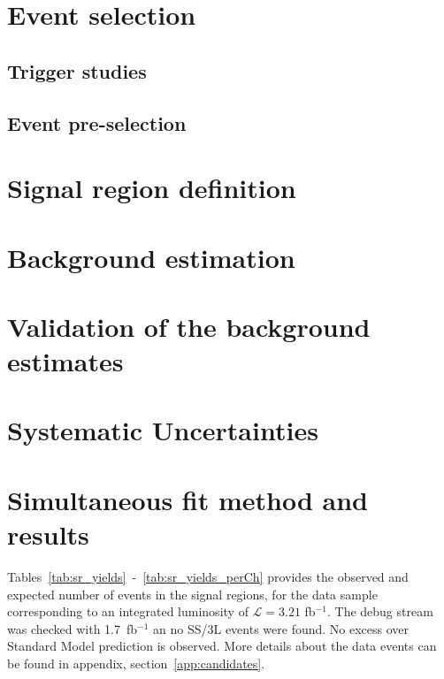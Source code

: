 \documentclass[UKenglish,texlive=2013]{\ATLASLATEXPATH atlasdoc}
\begin{document}
\section{Event selection}
\label{sec:evtsel}

\subsection{Trigger studies}
\label{sec:trigger}



\subsection{Event pre-selection}
\label{sec:presel}


\section{Signal region definition}
\label{sec:sr}



\section{Background estimation}
\label{sec:bkg}


\section{Validation of the background estimates}
\label{sec:bkg_validation}


\section{Systematic Uncertainties}
\label{sec:systematics}

 
\section{Simultaneous fit method and results}
\label{sec:fit}

Tables~\ref{tab:sr_yields}~-~\ref{tab:sr_yields_perCh} provides the observed and expected number of events in the signal regions, for the data sample corresponding to an integrated luminosity of $\mathcal L=3.21$ fb$^{-1}$. The debug stream was checked with 1.7~fb$^{-1}$ an no SS/3L events were found. 
No excess over Standard Model prediction is observed. More details about the data events can be found in appendix, section~\ref{app:candidates}.
\end{document}
